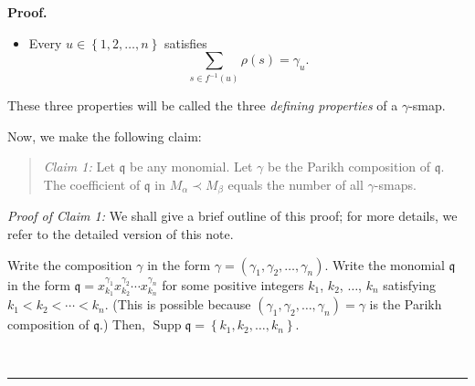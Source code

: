 \documentclass
[numbers=enddot,12pt,final,onecolumn,notitlepage,abstracton]{scrartcl}%
\theoremstyle{definition}
\newenvironment{statement}{\begin{quote}}{\end{quote}}
\newenvironment{proof}[1][Proof]{\noindent\textbf{#1.} }{\ \rule{0.5em}{0.5em}}
\newenvironment{vershort}{}{}
\let\sumnonlimits\sum
\renewcommand{\sum}{\sumnonlimits\limits}
\begin{document}
\begin{proof}
\begin{itemize}
\item Every $u\in\left\{  1,2,\ldots,n\right\}  $ satisfies%
\[
\sum_{s\in f^{-1}\left(  u\right)  }\rho\left(  s\right)  =\gamma_{u}.
\]

\end{itemize}

These three properties will be called the three \textit{defining properties}
of a $\gamma$-smap.

Now, we make the following claim:

\begin{statement}
\textit{Claim 1:} Let $\mathfrak{q}$ be any monomial. Let $\gamma$ be the
Parikh composition of $\mathfrak{q}$. The coefficient of $\mathfrak{q}$ in
$M_{\alpha}\left.  \prec\right.  M_{\beta}$ equals the number of all $\gamma$-smaps.
\end{statement}

\begin{vershort}
\textit{Proof of Claim 1:} We shall give a brief outline of this proof; for
more details, we refer to the detailed version of this note.

Write the composition $\gamma$ in the form $\gamma=\left(  \gamma_{1}%
,\gamma_{2},\ldots,\gamma_{n}\right)  $. Write the monomial $\mathfrak{q}$ in
the form $\mathfrak{q}=x_{k_{1}}^{\gamma_{1}}x_{k_{2}}^{\gamma_{2}}\cdots
x_{k_{n}}^{\gamma_{n}}$ for some positive integers $k_{1}$, $k_{2}$, $\ldots$,
$k_{n}$ satisfying $k_{1}<k_{2}<\cdots<k_{n}$. (This is possible because
$\left(  \gamma_{1},\gamma_{2},\ldots,\gamma_{n}\right)  =\gamma$ is the
Parikh composition of $\mathfrak{q}$.) Then, $\operatorname*{Supp}%
\mathfrak{q}=\left\{  k_{1},k_{2},\ldots,k_{n}\right\}  $.


\end{vershort}
\end{proof}
\end{document}
